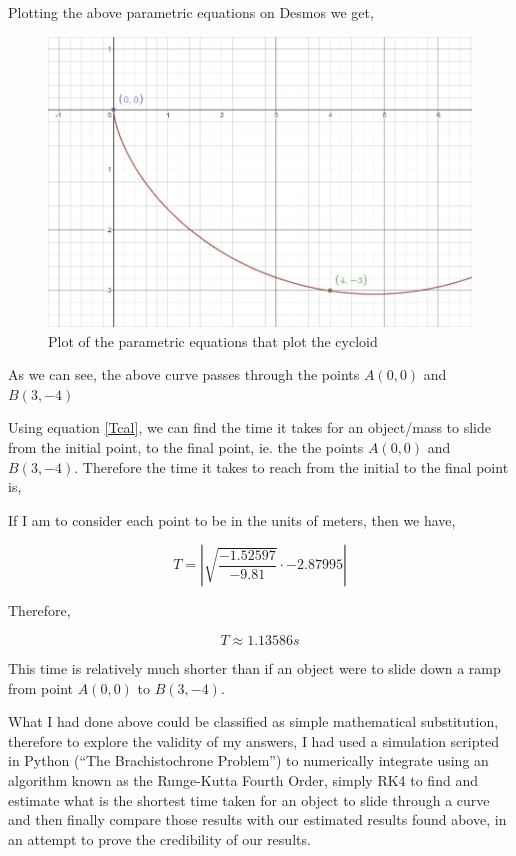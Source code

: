 {Plotting the above parametric equations on Desmos we get,}

\begin{figure}[H]
\centering
\includegraphics[width=15cm]{cycplt.jpg}
    		\caption{{Plot of the parametric equations that plot the cycloid}}
\end{figure}

{As we can see, the above curve passes through the points $A(0,0)$ and $B(3,-4)$}

{Using equation \ref{Tcal}, we can find the time it takes for an object/mass to slide from the initial point, to the final point, ie. the the points $A(0,0)$ and $B(3,-4)$. Therefore the time it takes to reach from the initial to the final point is,}

{If I am to consider each point to be in the units of meters, then we have,}

	$$T = \left|\sqrt{\frac{-1.52597}{-9.81}}\cdot -2.87995\right|$$

{Therefore,}

	$$T \approx 1.13586 s$$

{This time is relatively much shorter than if an object were to slide down a ramp from point $A(0,0)$ to $B(3,-4)$.}


{What I had done above could be classified as simple mathematical substitution, therefore to explore the validity of my answers, I had used a simulation scripted in Python (“The Brachistochrone Problem”) to numerically integrate using an algorithm known as the Runge-Kutta Fourth Order, simply RK4 to find and estimate what is the shortest time taken for an object to slide through a curve and then finally compare those results with our estimated results found above, in an attempt to prove the credibility of our results.}

